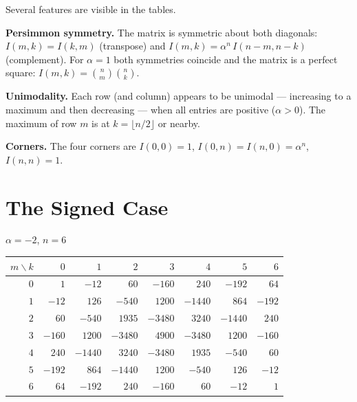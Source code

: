 \documentclass[11pt,a4paper]{article}
\theoremstyle{plain}
\theoremstyle{definition}
\begin{document}
\begin{tcolorbox}[colback=yellow!10, colframe=yellow!10, boxrule=0pt,
  sharp corners]
Several features are visible in the tables.

\textbf{Persimmon symmetry.} The matrix is symmetric about both
diagonals: $I(m,k) = I(k,m)$ (transpose) and
$I(m,k) = \alpha^n\, I(n{-}m, n{-}k)$ (complement). For $\alpha = 1$
both symmetries coincide and the matrix is a perfect square:
$I(m,k) = \binom{n}{m}\binom{n}{k}$.

\textbf{Unimodality.} Each row (and column) appears to be unimodal
--- increasing to a maximum and then decreasing --- when all entries
are positive ($\alpha > 0$). The maximum of row $m$ is at
$k = \lfloor n/2 \rfloor$ or nearby.

\textbf{Corners.} The four corners are
$I(0,0) = 1$, $I(0,n) = I(n,0) = \alpha^n$, $I(n,n) = 1$.
\end{tcolorbox}

\section{The Signed Case}

\begin{tcolorbox}[colback=black!5, colframe=black!5, boxrule=0pt,
  sharp corners]
\begin{center}
$\alpha = -2$, $n = 6$

\medskip
\begin{tabular}{r|rrrrrrr}
$m \!\backslash\! k$ & $0$ & $1$ & $2$ & $3$ & $4$ & $5$ & $6$ \\
\hline
$0$ & $1$ & $-12$ & $60$ & $-160$ & $240$ & $-192$ & $64$ \\
$1$ & $-12$ & $126$ & $-540$ & $1200$ & $-1440$ & $864$ & $-192$ \\
$2$ & $60$ & $-540$ & $1935$ & $-3480$ & $3240$ & $-1440$ & $240$ \\
$3$ & $-160$ & $1200$ & $-3480$ & $4900$ & $-3480$ & $1200$ & $-160$ \\
$4$ & $240$ & $-1440$ & $3240$ & $-3480$ & $1935$ & $-540$ & $60$ \\
$5$ & $-192$ & $864$ & $-1440$ & $1200$ & $-540$ & $126$ & $-12$ \\
$6$ & $64$ & $-192$ & $240$ & $-160$ & $60$ & $-12$ & $1$ \\
\end{tabular}
\end{center}
\end{tcolorbox}
\end{document}

